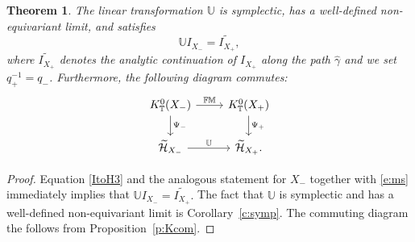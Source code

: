 \documentclass[pdftex]{sigma}
\newtheorem{Theorem}{Theorem}[section]
\numberwithin{equation}{section}
\newcommand{\cc}[1]{\mathcal{#1}} %
\newcommand{\UU}{\mathbb{U}}
\newcommand{\torus}{\mathbb{T}}
\newcommand{\FM}{\mathbb{FM}}
\begin{document}
\begin{Theorem} \label{t:st3}
The linear transformation $\UU$ is symplectic, has a well-defined non-equivariant limit, and satisfies
\[
\UU I_{X_{-}} =\widetilde{I_{X_{+}}},
\]
where $\widetilde{I_{X_{+}}}$ denotes the analytic continuation of $I_{X_{+}}$ along the path $\hat \gamma$ and we set $q_+^{-1} = q_-$.
Furthermore, the following diagram commutes:
\[
\begin{tikzcd}
K^0_\torus(X_{-}) \ar[r, "\FM"] \ar[d, "\Psi_-"] & K^0_\torus(X_{+}) \ar[d, "\Psi_+"] \\
\widetilde{\cc H}_{X_{-}} \ar[r, "\UU"] & \widetilde{\cc H}_{X_{+}}.
\end{tikzcd}
\]
\end{Theorem}
\begin{proof}
Equation \eqref{ItoH3} and the analogous statement for $X_-$ together with \eqref{e:ms} immediately implies that $\UU I_{X_{-}} =\widetilde{I_{X_{+}}}.$ The fact that $\UU$ is symplectic and has a well-defined non-equivariant limit is Corollary~\ref{c:symp}. The commuting diagram the follows from Proposition~\ref{p:Kcom}.
\end{proof}
\end{document}
